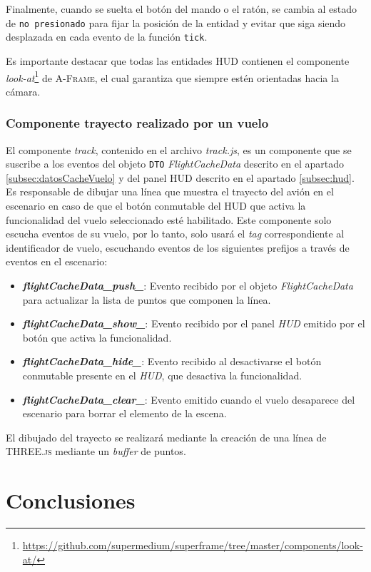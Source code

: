 \documentclass[a4paper, 11pt]{book}
\begin{document}
Finalmente, cuando se suelta el botón del mando o el ratón, se cambia al estado de  \texttt{no presionado} para fijar la posición de la entidad y evitar que siga siendo desplazada en cada evento de la función \texttt{tick}.

Es importante destacar que todas las entidades \textsc{\gls{HUD}} contienen el componente \emph{look-at}\footnote{\url{https://github.com/supermedium/superframe/tree/master/components/look-at/}} de \textsc{A-Frame}, el cual garantiza que siempre estén orientadas hacia la cámara.
\subsection{Componente trayecto realizado por un vuelo}
\label{subsec:track}
El componente \emph{track}, contenido en el archivo \emph{track.js}, es un componente que se suscribe a los eventos del objeto \texttt{\gls{DTO}} \emph{FlightCacheData} descrito en el apartado \ref{subsec:datosCacheVuelo} y del panel \textsc{\gls{HUD}} descrito en el apartado \ref{subsec:hud}.
Es responsable de dibujar una línea que muestra el trayecto del avión en el escenario en caso de que el botón conmutable del \textsc{\gls{HUD}} que activa la funcionalidad del vuelo seleccionado esté habilitado. Este componente solo escucha eventos de su vuelo, por lo tanto, solo usará el \emph{tag} correspondiente al identificador de vuelo, escuchando eventos de los siguientes prefijos a través de eventos en el escenario:
\begin{itemize}
	\item \textbf{\emph{flightCacheData\_push\_}}: Evento recibido por el objeto \emph{FlightCacheData} para actualizar la lista de puntos que componen la línea.
	\item \textbf{\emph{flightCacheData\_show\_}}: Evento recibido por el panel \emph{HUD} emitido por el botón que activa la funcionalidad.
	\item \textbf{\emph{flightCacheData\_hide\_}}: Evento recibido al desactivarse el botón conmutable presente en el \emph{HUD}, que desactiva la funcionalidad.
	\item \textbf{\emph{flightCacheData\_clear\_}}: Evento emitido cuando el vuelo desaparece del escenario para borrar el elemento de la escena.
\end{itemize}
El dibujado del trayecto se realizará mediante la creación de una línea de \textsc{THREE.js} mediante un \emph{buffer} de puntos.
\chapter{Conclusiones}
\label{chap:conclusiones}
\end{document}
